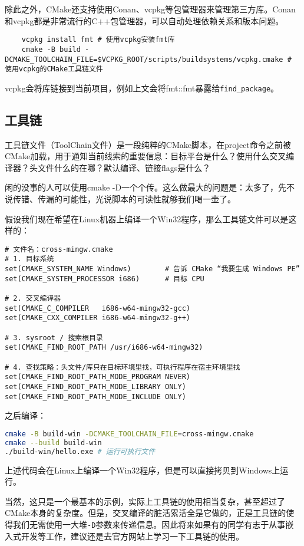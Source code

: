 \documentclass[../main.tex]{subfiles}
\begin{document}
除此之外，CMake还支持使用Conan、vcpkg等包管理器来管理第三方库。Conan和vcpkg都是非常流行的C++包管理器，可以自动处理依赖关系和版本问题。
\begin{lstlisting}
    vcpkg install fmt # 使用vcpkg安装fmt库
    cmake -B build -DCMAKE_TOOLCHAIN_FILE=$VCPKG_ROOT/scripts/buildsystems/vcpkg.cmake # 使用vcpkg的CMake工具链文件
\end{lstlisting}
vcpkg会将库链接到当前项目，例如上文会将fmt::fmt暴露给\texttt{find\_package}。

\subsection{工具链}

工具链文件（ToolChain文件）是一段纯粹的CMake脚本，在project命令之前被CMake加载，用于通知当前线索的重要信息：目标平台是什么？使用什么交叉编译器？头文件什么的在哪？默认编译、链接flags是什么？

闲的没事的人可以使用cmake -D一个个传。这么做最大的问题是：太多了，先不说传错、传漏的可能性，光说脚本的可读性就够我们喝一壶了。

假设我们现在希望在Linux机器上编译一个Win32程序，那么工具链文件可以是这样的：
\begin{lstlisting}
# 文件名：cross-mingw.cmake
# 1. 目标系统
set(CMAKE_SYSTEM_NAME Windows)        # 告诉 CMake “我要生成 Windows PE”
set(CMAKE_SYSTEM_PROCESSOR i686)      # 目标 CPU

# 2. 交叉编译器
set(CMAKE_C_COMPILER   i686-w64-mingw32-gcc)
set(CMAKE_CXX_COMPILER i686-w64-mingw32-g++)

# 3. sysroot / 搜索根目录
set(CMAKE_FIND_ROOT_PATH /usr/i686-w64-mingw32)

# 4. 查找策略：头文件/库只在目标环境里找，可执行程序在宿主环境里找
set(CMAKE_FIND_ROOT_PATH_MODE_PROGRAM NEVER)
set(CMAKE_FIND_ROOT_PATH_MODE_LIBRARY ONLY)
set(CMAKE_FIND_ROOT_PATH_MODE_INCLUDE ONLY)
\end{lstlisting}
之后编译：
\begin{lstlisting}[language=bash]
cmake -B build-win -DCMAKE_TOOLCHAIN_FILE=cross-mingw.cmake
cmake --build build-win
./build-win/hello.exe # 运行可执行文件
\end{lstlisting}
上述代码会在Linux上编译一个Win32程序，但是可以直接拷贝到Windows上运行。

当然，这只是一个最基本的示例，实际上工具链的使用相当复杂，甚至超过了CMake本身的复杂度。但是，交叉编译的脏活累活全是它做的，正是工具链的使得我们无需使用一大堆\texttt{-D}参数来传递信息。因此将来如果有的同学有志于从事嵌入式开发等工作，建议还是去官方网站上学习一下工具链的使用。
\end{document}
